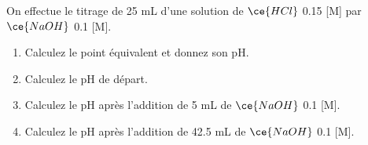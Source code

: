 \documentclass[
  11pt,
  french,
  a4paper,
  openany]{book}
\providecommand{\tightlist}{%
  \setlength{\itemsep}{0pt}\setlength{\parskip}{0pt}}
\begin{document}
\begin{Exercise}

On effectue le titrage de 25 mL d'une solution de \(\ce{HCl}\) 0.15 {[}M{]} par \(\ce{NaOH}\) 0.1 {[}M{]}.

\begin{enumerate}
\def\labelenumi{\alph{enumi}.}
\tightlist
\item
  Calculez le point équivalent et donnez son pH.
\item
  Calculez le pH de départ.
\item
  Calculez le pH après l'addition de 5 mL de \(\ce{NaOH}\) 0.1 {[}M{]}.
\item
  Calculez le pH après l'addition de 42.5 mL de \(\ce{NaOH}\) 0.1 {[}M{]}.
\end{enumerate}


\end{Exercise}
\end{document}
